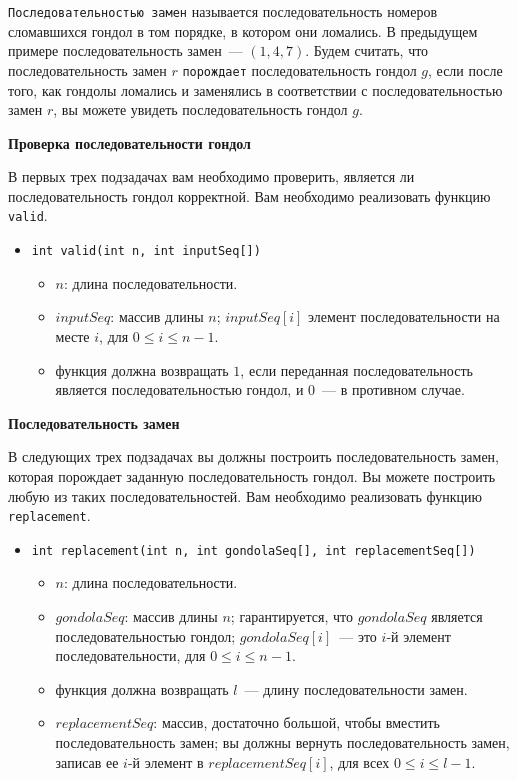 \texttt{Последовательностью замен} называется последовательность номеров сломавшихся гондол в том порядке, в котором они ломались. В предыдущем примере последовательность замен~--- $(1, 4, 7)$. Будем считать, что последовательность замен $r$ \texttt{порождает} последовательность гондол $g$, если после того, как гондолы ломались и заменялись в соответствии с последовательностью замен $r$, вы можете увидеть последовательность гондол $g$.

\textbf{Проверка последовательности гондол}

В первых трех подзадачах вам необходимо проверить, является ли последовательность гондол
корректной. Вам необходимо реализовать функцию \texttt{valid}.

\begin{itemize}
\item \texttt{int valid(int n, int inputSeq[])}
\begin{itemize}
\item $n$: длина последовательности.
\item $inputSeq$: массив длины $n$; $inputSeq[i]$ элемент последовательности на месте $i$, для $0 \le i \le n - 1$.
\item функция должна возвращать $1$, если переданная последовательность является
последовательностью гондол, и $0$~--- в противном случае.
\end{itemize}
\end{itemize}

\textbf{Последовательность замен}

В следующих трех подзадачах вы должны построить последовательность замен, которая
порождает заданную последовательность гондол. Вы можете построить любую из таких
последовательностей. Вам необходимо реализовать функцию \texttt{replacement}.

\begin{itemize}
\item \texttt{int replacement(int n, int gondolaSeq[], int replacementSeq[])}
\begin{itemize}
\item $n$: длина последовательности.
\item $gondolaSeq$: массив длины $n$; гарантируется, что $gondolaSeq$ является
последовательностью гондол; $gondolaSeq[i]$~--- это $i$-й элемент последовательности, для $0 \le i \le n - 1$.
\item функция должна возвращать $l$~--- длину последовательности замен.
\item $replacementSeq$: массив, достаточно большой, чтобы вместить последовательность замен; вы должны вернуть последовательность замен, записав ее $i$-й элемент в $replacementSeq[i]$, для всех $0 \le i \le l - 1$.
\end{itemize}
\end{itemize}

